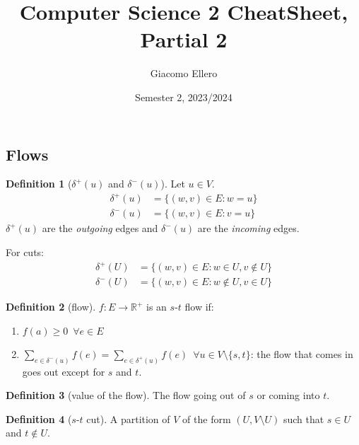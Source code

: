 \documentclass[8pt]{extarticle}
\author{Giacomo Ellero}
\title{Computer Science 2 CheatSheet, Partial 2}
\date{Semester 2, 2023/2024}
\newcommand{\R}{\mathbb{R}}
\theoremstyle{definition}
\newtheorem{definition}{Definition}[section]
\theoremstyle{remark}
\numberwithin{equation}{section}
\begin{document}

\begin{landscape}


    \begin{multicols}{3}
        \section{Flows}

        \begin{definition}[$\delta^+(u)$ and $\delta^-(u)$]
            Let $u \in V$.
            \begin{align}
                \delta^+(u) & = \{(w, v) \in E : w = u\} \\
                \delta^-(u) & = \{(w, v) \in E : v = u\}
            \end{align}
            $\delta^+(u)$ are the \emph{outgoing} edges and $\delta^-(u)$ are the \emph{incoming} edges.

            For cuts:
            \begin{align}
                \delta^+(U) & = \{(w, v) \in E : w \in U, v \notin U\} \\
                \delta^-(U) & = \{(w, v) \in E : w \notin U, v \in U\}
            \end{align}
        \end{definition}

        \begin{definition}[flow]
            \label{def:flow:flow}
            $f:E \to \R^+$ is an $s$-$t$ flow if:
            \begin{enumerate}[label=\roman*.]
                \item $f(a) \geq 0 \enspace \forall e \in E$
                \item $\sum_{e \in \delta^-(u)} f(e) = \sum_{e \in \delta^+(u)} f(e) \enspace \forall u \in V \setminus \{ s, t \}$: the flow that comes in goes out except for $s$ and $t$.
            \end{enumerate}
        \end{definition}

        \begin{definition}[value of the flow]
            The flow going out of $s$ or coming into $t$.
        \end{definition}

        \begin{definition}[$s$-$t$ cut]
            A partition of $V$ of the form $(U, V \setminus U)$ such that $s \in U$ and $t \notin U$.
        \end{definition}


\end{multicols}
\end{landscape}
\end{document}
